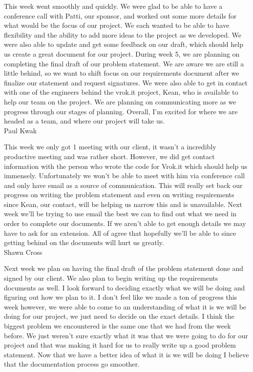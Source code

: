 \documentclass[letterpaper, 10pt, draftclsnofoot, compsoc, onecolumn]{IEEEtran}
\begin{document}
This week went smoothly and quickly. We were glad to be able to have a conference call with Patti, our sponsor, and worked out some more details for what would be the focus of our project. We each wanted to be able to have flexibility and the ability to add more ideas to the project as we developed. We were also able to update and get some feedback on our draft, which should help us create a great document for our project. During week 5, we are planning on completing the final draft of our problem statement. We are aware we are still a little behind, so we want to shift focus on our requirements document after we finalize our statement and request signatures. We were also able to get in contact with one of the engineers behind the vrok.it project, Kean, who is available to help our team on the project. We are planning on communicating more as we progress through our stages of planning. Overall, I'm excited for where we are headed as a team, and where our project will take us.\\

Paul Kwak

This week we only got 1 meeting with our client, it wasn't a incredibly productive meeting and was rather short. However, we did get contact information with the person who wrote the code for Vrok.it which should help us immensely. Unfortunately we won't be able to meet with him via conference call and only have email as a source of communication. This will really set back our progress on writing the problem statement and even on writing requirements since Kean, our contact, will be helping us narrow this and is unavailable. Next week we'll be trying to use email the best we can to find out what we need in order to complete our documents. If we aren't able to get enough details we may have to ask for an extension. All of agree that hopefully we'll be able to since getting behind on the documents will hurt us greatly.\\

Shawn Cross

Next week we plan on having the final draft of the problem statement done and signed by our client. We also plan to begin writing up the requirements documents as well. I look forward to deciding exactly what we will be doing and figuring out how we plan to it. I don't feel like we made a ton of progress this week however, we were able to come to an understanding of what it is we will be doing for our project, we just need to decide on the exact details. I think the biggest problem we encountered is the same one that we had from the week before. We just weren't sure exactly what it was that we were going to do for our project and that was making it hard for us to really write up a good problem statement. Now that we have a better idea of what it is we will be doing I believe that the documentation process go smoother.\\
\end{document}
